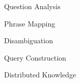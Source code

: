\documentclass{beamer}
\begin{document}
\begin{frame}{Question Analysis}
\end{frame}
\begin{frame}{Phrase Mapping}
\end{frame}
\begin{frame}{Disambiguation}
\end{frame}
\begin{frame}{Query Construction}
\end{frame}
\begin{frame}{Distributed Knowledge}
\end{frame}

\end{document}
